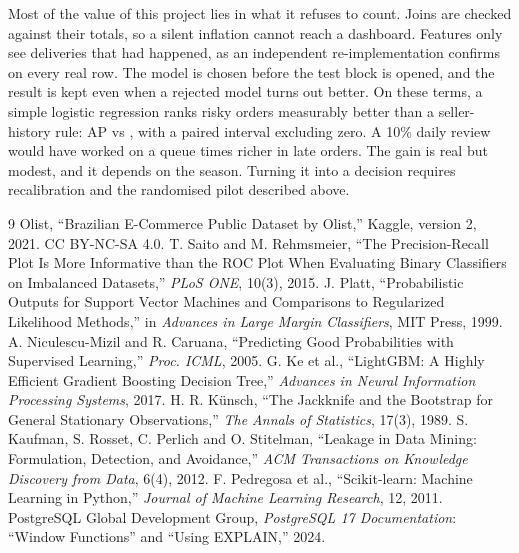 \documentclass[10pt,twocolumn]{article}
\begin{document}
Most of the value of this project lies in what it refuses to count. Joins are checked against their
totals, so a silent \FanoutPct{} inflation cannot reach a dashboard. Features only see deliveries that
had happened, as an independent re-implementation confirms on every real row. The model is chosen
before the test block is opened, and the result is kept even when a rejected model turns out better. On
these terms, a simple logistic regression ranks risky orders measurably better than a seller-history
rule: AP \APSel{} vs \APRule{}, with a paired interval excluding zero. A 10\% daily review would have
worked on a queue \CapLift{} times richer in late orders. The gain is real but modest, and it depends on
the season. Turning it into a decision requires recalibration and the randomised pilot described above.

\small
\begin{thebibliography}{9}\setlength{\itemsep}{1pt}
 Olist, ``Brazilian E-Commerce Public Dataset by Olist,'' Kaggle, version 2, 2021. CC BY-NC-SA 4.0.
 T. Saito and M. Rehmsmeier, ``The Precision-Recall Plot Is More Informative than the ROC Plot When Evaluating Binary Classifiers on Imbalanced Datasets,'' \emph{PLoS ONE}, 10(3), 2015.
 J. Platt, ``Probabilistic Outputs for Support Vector Machines and Comparisons to Regularized Likelihood Methods,'' in \emph{Advances in Large Margin Classifiers}, MIT Press, 1999.
 A. Niculescu-Mizil and R. Caruana, ``Predicting Good Probabilities with Supervised Learning,'' \emph{Proc. ICML}, 2005.
 G. Ke et al., ``LightGBM: A Highly Efficient Gradient Boosting Decision Tree,'' \emph{Advances in Neural Information Processing Systems}, 2017.
 H. R. K\"unsch, ``The Jackknife and the Bootstrap for General Stationary Observations,'' \emph{The Annals of Statistics}, 17(3), 1989.
 S. Kaufman, S. Rosset, C. Perlich and O. Stitelman, ``Leakage in Data Mining: Formulation, Detection, and Avoidance,'' \emph{ACM Transactions on Knowledge Discovery from Data}, 6(4), 2012.
 F. Pedregosa et al., ``Scikit-learn: Machine Learning in Python,'' \emph{Journal of Machine Learning Research}, 12, 2011.
 PostgreSQL Global Development Group, \emph{PostgreSQL 17 Documentation}: ``Window Functions'' and ``Using EXPLAIN,'' 2024.
\end{thebibliography}
\end{document}
